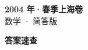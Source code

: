\documentclass[zihao=-4, a4paper]{ctexart}
\begin{document}
\begin{center}
  {\Large\bfseries 2004 年·春季上海卷}\\[4pt]
  {\large 数学 · 简答版}
\end{center}
\medskip
{}

\clearpage
{}
\begin{center}{\Large\bfseries 答案速查}\end{center}
\medskip

\end{document}
